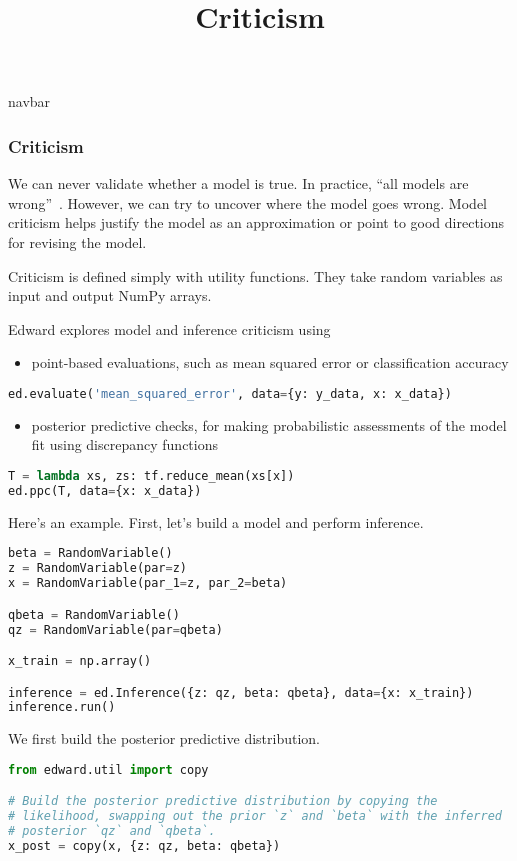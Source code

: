\title{Criticism}

{{navbar}}

\subsubsection{Criticism}

We can never validate whether a model is true. In practice, ``all
models are wrong''~\citep{box1976science}. However, we can try to
uncover where the model goes wrong. Model criticism helps justify the
model as an approximation or point to good directions for revising the
model.

Criticism is defined simply with utility functions. They take random
variables as input and output NumPy arrays.

Edward explores model and inference criticism using
\begin{itemize}
  \item point-based evaluations, such as mean squared error or
  classification accuracy
\end{itemize}
\begin{lstlisting}[language=Python]
ed.evaluate('mean_squared_error', data={y: y_data, x: x_data})
\end{lstlisting}
\begin{itemize}
  \item posterior predictive checks, for making probabilistic
  assessments of the model fit using discrepancy functions
\end{itemize}
\begin{lstlisting}[language=Python]
T = lambda xs, zs: tf.reduce_mean(xs[x])
ed.ppc(T, data={x: x_data})
\end{lstlisting}

Here's an example. First, let's build a model and perform
inference.
\begin{lstlisting}[language=Python]
beta = RandomVariable()
z = RandomVariable(par=z)
x = RandomVariable(par_1=z, par_2=beta)

qbeta = RandomVariable()
qz = RandomVariable(par=qbeta)

x_train = np.array()

inference = ed.Inference({z: qz, beta: qbeta}, data={x: x_train})
inference.run()
\end{lstlisting}
We first build the posterior predictive distribution.
\begin{lstlisting}[language=Python]
from edward.util import copy

# Build the posterior predictive distribution by copying the
# likelihood, swapping out the prior `z` and `beta` with the inferred
# posterior `qz` and `qbeta`.
x_post = copy(x, {z: qz, beta: qbeta})
\end{lstlisting}

